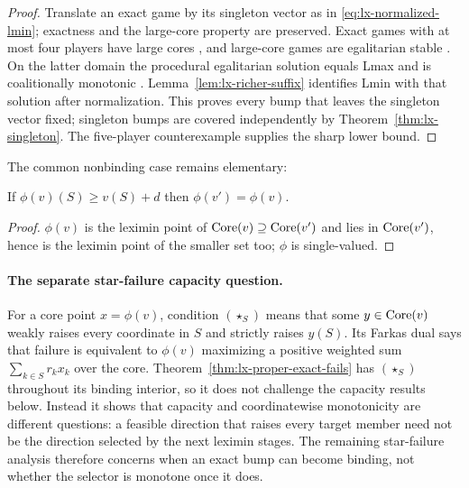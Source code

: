 \begin{proof}
Translate an exact game by its singleton vector as in
\eqref{eq:lx-normalized-lmin}; exactness and the large-core property are
preserved.  Exact games with at most four players have large cores
\citep{Biswas1999}, and large-core games are egalitarian stable
\citep{Dietzenbacher2021}.  On the latter domain the procedural egalitarian
solution equals Lmax and is coalitionally monotonic
\citep{Dietzenbacher2021}.  Lemma~\ref{lem:lx-richer-suffix} identifies Lmin
with that solution after normalization.  This proves every bump that leaves
the singleton vector fixed; singleton bumps are covered independently by
Theorem~\ref{thm:lx-singleton}.  The five-player counterexample supplies the
sharp lower bound.
\end{proof}

The common nonbinding case remains elementary:

\begin{lemma}\label{lem:lx-nonbinding}
If $\phi(v)(S)\ge v(S)+d$ then $\phi(v')=\phi(v)$.
\end{lemma}
\begin{proof}
$\phi(v)$ is the leximin point of $\operatorname{Core}(v)\supseteq\operatorname{Core}(v')$ and lies in
$\operatorname{Core}(v')$, hence is the leximin point of the smaller set too; $\phi$ is
single-valued.
\end{proof}

\paragraph{The separate star-failure capacity question.}
For a core point $x=\phi(v)$, condition $(\star_S)$ means that some
$y\in\operatorname{Core}(v)$ weakly raises every coordinate in $S$ and strictly raises
$y(S)$.  Its Farkas dual says that failure is equivalent to $\phi(v)$
maximizing a positive weighted sum $\sum_{k\in S}r_kx_k$ over the core.
Theorem~\ref{thm:lx-proper-exact-fails} has $(\star_S)$ throughout its
binding interior, so it does not challenge the capacity results below.
Instead it shows that capacity and coordinatewise monotonicity are different
questions: a feasible direction that raises every target member need not be
the direction selected by the next leximin stages.  The remaining
star-failure analysis therefore concerns when an exact bump can become
binding, not whether the selector is monotone once it does.

